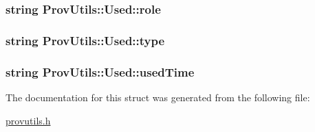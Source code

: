 \hypertarget{struct_prov_utils_1_1_used_a3f01967a2959a16d281ef6670436020a}{
\subsubsection[{role}]{\setlength{\rightskip}{0pt plus 5cm}string Prov\-Utils\-::\-Used\-::role}}\label{struct_prov_utils_1_1_used_a3f01967a2959a16d281ef6670436020a}
\hypertarget{struct_prov_utils_1_1_used_aad9ebc316314b07ee9f6a28467de6948}{
\subsubsection[{type}]{\setlength{\rightskip}{0pt plus 5cm}string Prov\-Utils\-::\-Used\-::type}}\label{struct_prov_utils_1_1_used_aad9ebc316314b07ee9f6a28467de6948}
\hypertarget{struct_prov_utils_1_1_used_a1df6793b3f8578bcd10d4656686076a1}{
\subsubsection[{used\-Time}]{\setlength{\rightskip}{0pt plus 5cm}string Prov\-Utils\-::\-Used\-::used\-Time}}\label{struct_prov_utils_1_1_used_a1df6793b3f8578bcd10d4656686076a1}


The documentation for this struct was generated from the following file\-:\begin{DoxyCompactItemize}
\item 
\hyperlink{provutils_8h}{provutils.\-h}\end{DoxyCompactItemize}
